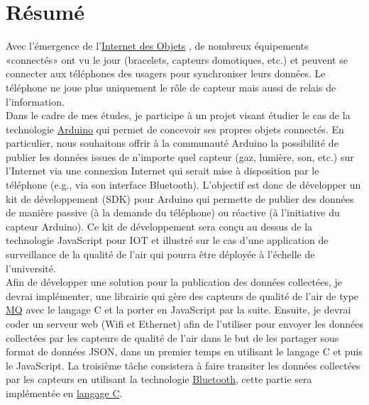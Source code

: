 \section*{Résumé}

Avec l’émergence de l’\href{https://fr.wikipedia.org/wiki/Internet_des_objets}{Internet des Objets} , de nombreux équipements «connectés» ont vu le jour (bracelets, capteurs domotiques, etc.) et peuvent se connecter aux téléphones des usagers pour synchroniser leurs données. Le téléphone ne joue plus uniquement le rôle de capteur mais aussi de relais de l’information.\\

Dans le cadre de mes études, je participe à un projet visant étudier le cas de la technologie \href{https://www.arduino.cc/}{Arduino} qui permet de concevoir ses propres objets connectés. En particulier, nous souhaitons offrir à la communauté Arduino la possibilité de publier les données issues de n’importe quel capteur (gaz, lumière, son, etc.) sur l’Internet via une connexion Internet qui serait mise à disposition par le téléphone (e.g., via son interface Bluetooth). L’objectif est donc de développer un kit de développement (SDK) pour Arduino qui permette de publier des données de manière passive (à la demande du téléphone) ou réactive (à l’initiative du capteur Arduino). Ce kit de développement sera conçu au dessus de la technologie JavaScript pour IOT et illustré sur le cas d’une application de surveillance de la qualité de l’air qui pourra être déployée à l’échelle de l’université.\\

Afin de développer une solution pour la publication des données collectées, je devrai implémenter, une librairie qui gère  des capteurs de qualité de l'air de type \href{http://www.china-total.com/Product/meter/gas-sensor/Gas-sensor.htm}{MQ} avec le langage C et la porter en JavaScript par la suite. 
Ensuite, je devrai coder un serveur web (Wifi et Ethernet) afin de l'utiliser pour envoyer les données collectées par les capteurs de qualité de l'air dans le but de les partager sous format de données JSON, dans un premier temps en utilisant le langage C et puis le JavaScript.
La troisième tâche consistera à faire transiter les données collectées par les capteurs en utilisant la technologie \href{https://www.bluetooth.com/}{Bluetooth}, cette partie sera implémentée en \href{https://fr.wikipedia.org/wiki/C_(langage)}{langage C}.\\

